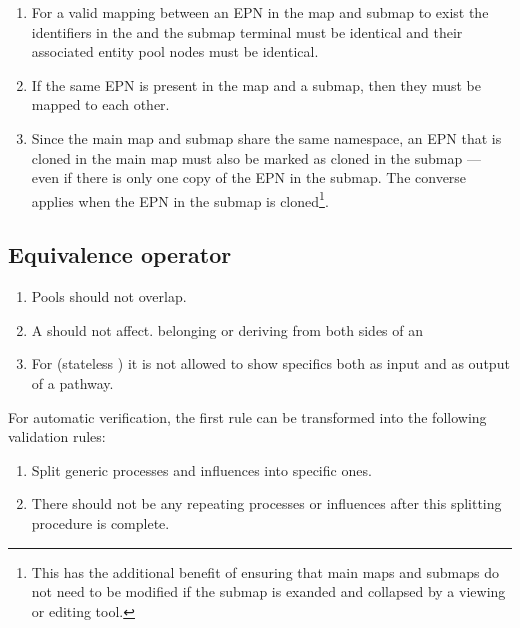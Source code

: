 \begin{enumerate}
\item For a valid mapping between an EPN in the map and submap to exist the identifiers in the  and the submap terminal must be identical and their associated entity pool nodes must be identical.
\item If the same EPN is present in the map and a submap, then they must be mapped to each other.
\item Since the main map and submap share the same namespace, an EPN that is cloned in the main map must also be
marked as cloned in the submap --- even if there is only one copy of the EPN in the submap. The converse applies when the EPN in the submap is cloned\footnote{This has the additional benefit of ensuring that main maps and submaps do not need to be modified if the submap is exanded and collapsed by a viewing or editing tool.}.
\end{enumerate}

\subsection{Equivalence operator}
\label{sec:eq-semantics}

\begin{enumerate}
    \item Pools should not overlap.
    \item A  should not affect.  belonging or deriving from both sides of an 
    \item For  (stateless ) it is not allowed to show specifics both as input and as output of a pathway.
\end{enumerate}

For automatic verification, the first rule can be transformed into the following validation rules:
\begin{enumerate}[label=(\alph*)]
    \item Split generic processes and influences into specific ones.
    \item There should not be any repeating processes or influences after this splitting procedure is complete.
\end{enumerate}
